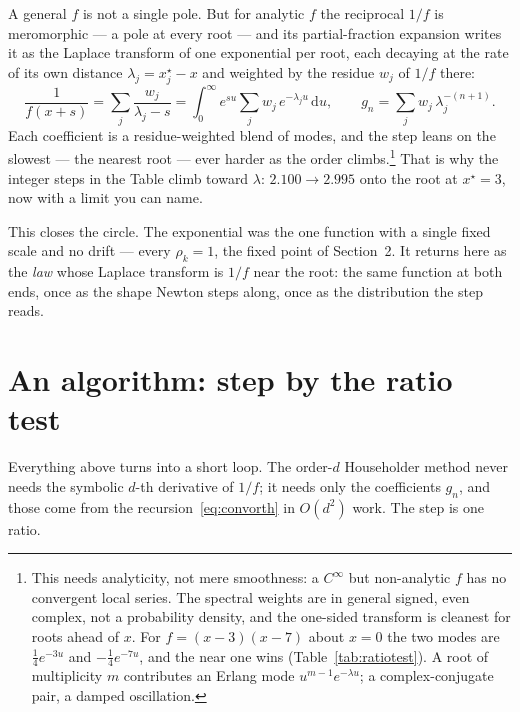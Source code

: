 \documentclass[11pt]{article}
\newcommand{\dd}{\mathrm{d}}
\newcommand{\rr}{\rho}                  %
\newcommand{\order}{d}                  %
\begin{document}
A general $f$ is not a single pole. But for analytic $f$ the reciprocal $1/f$ is
meromorphic --- a pole at every root --- and its partial-fraction expansion writes it
as the Laplace transform of one exponential per root, each decaying at the rate of its
own distance $\lambda_j=x^\star_j-x$ and weighted by the residue $w_j$ of $1/f$ there:
\begin{equation}
  \frac{1}{f(x+s)} = \sum_j \frac{w_j}{\lambda_j-s}
   = \int_0^\infty e^{su}\sum_j w_j\,e^{-\lambda_j u}\,\dd u,
  \qquad
  g_n = \sum_j w_j\,\lambda_j^{-(n+1)}.
  \label{eq:spectral}
\end{equation}
Each coefficient is a residue-weighted blend of modes, and the step leans on the
slowest --- the nearest root --- ever harder as the order climbs.\footnote{This needs
analyticity, not mere smoothness: a $C^\infty$ but non-analytic $f$ has no convergent
local series. The spectral weights are in general signed, even complex, not a
probability density, and the one-sided transform is cleanest for roots ahead of $x$.
For $f=(x-3)(x-7)$ about $x=0$ the two modes are $\tfrac14 e^{-3u}$ and
$-\tfrac14 e^{-7u}$, and the near one wins (Table~\ref{tab:ratiotest}). A root of
multiplicity $m$ contributes an Erlang mode $u^{m-1}e^{-\lambda u}$; a
complex-conjugate pair, a damped oscillation.} That is why the integer steps in the
Table climb toward $\lambda$: $2.100\to2.995$ onto the root at $x^\star=3$, now with a
limit you can name.

This closes the circle. The exponential was the one function with a single fixed scale
and no drift --- every $\rr_k=1$, the fixed point of Section~2. It returns here as the
\emph{law} whose Laplace transform is $1/f$ near the root: the same function at both
ends, once as the shape Newton steps along, once as the distribution the step reads.

\section{An algorithm: step by the ratio test}

Everything above turns into a short loop. The order-$\order$ Householder method never
needs the symbolic $\order$-th derivative of $1/f$; it needs only the coefficients
$g_n$, and those come from the recursion~\eqref{eq:convorth} in $O(\order^2)$ work. The
step is one ratio.
\end{document}
